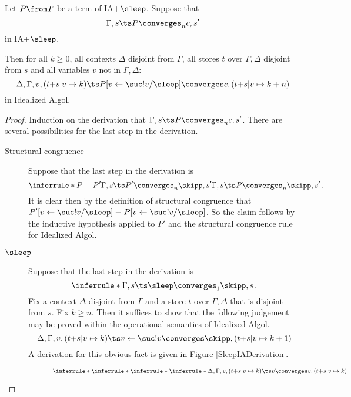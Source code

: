 \begin{lemma}
  Let $P\from T$ be a term of IA+$\sleep$.
  Suppose that
  \[
    \Gamma,s\ts P\converges_n c,s'
    \]
  in IA+$\sleep$.


  Then for all $k\ge 0$, all contexts $\Delta$ disjoint from $\Gamma$, all stores $t$ over $\Gamma,\Delta$ disjoint from $s$ and all variables $v$ not in $\Gamma,\Delta$:
  \[
    \Delta,\Gamma,v,(t{+}s\vert v \mapsto k)\ts P[v \gets \suc !v/\sleep] \converges c,(t{+}s\vert v \mapsto k+n)
    \]
  in Idealized Algol.
  \label{IaSleepsSoundnessLemma}
\end{lemma}
\begin{proof}
  Induction on the derivation that $\Gamma,s\ts P\converges_n c,s'$.
  There are several possibilities for the last step in the derivation.
  \begin{description}
    \item[Structural congruence]
      Suppose that the last step in the derivation is
      \[
        \inferrule*{P\equiv P'\\
        \Gamma,s\ts P' \converges_n \skipp, s'}
        {\Gamma,s\ts P\converges_n \skipp, s'}\,.
        \]
      It is clear then by the definition of structural congruence that $P'[v\gets\suc !v/\sleep]\equiv P[v\gets\suc !v/\sleep]$.  
      So the claim follows by the inductive hypothesis applied to $P'$ and the structural congruence rule for Idealized Algol.
    \item[$\sleep$]
      Suppose that the last step in the derivation is
      \[
        \inferrule*{ }
        {\Gamma,s\ts \sleep \converges_1 \skipp,s}\,.
        \]
      Fix a context $\Delta$ disjoint from $\Gamma$ and a store $t$ over $\Gamma,\Delta$ that is disjoint from $s$.  
      Fix $k\ge n$.  
      Then it suffices to show that the following judgement may be proved within the operational semantics of Idealized Algol.
      \[
        \Delta,\Gamma,v,(t{+}s\vert v\mapsto k)\ts v \gets \suc !v \converges \skipp, (t{+}s\vert v\mapsto k+1)
        \]
      A derivation for this obvious fact is given in Figure \ref{SleepIADerivation}.
      \begin{SidewaysFigure}
        \centering
        \begin{subfigure}{\textheight}
          \[
            \inferrule*
            {
              \inferrule*
              {
                \inferrule*
                {
                  \inferrule*
                  {
                  }
                  {
                    \Delta,\Gamma,v,(t{+}s\vert v\mapsto k)\ts v \converges v,(t{+}s\vert v\mapsto k)
}}}}\]
\end{subfigure}
\end{SidewaysFigure}
\end{description}
\end{proof}
